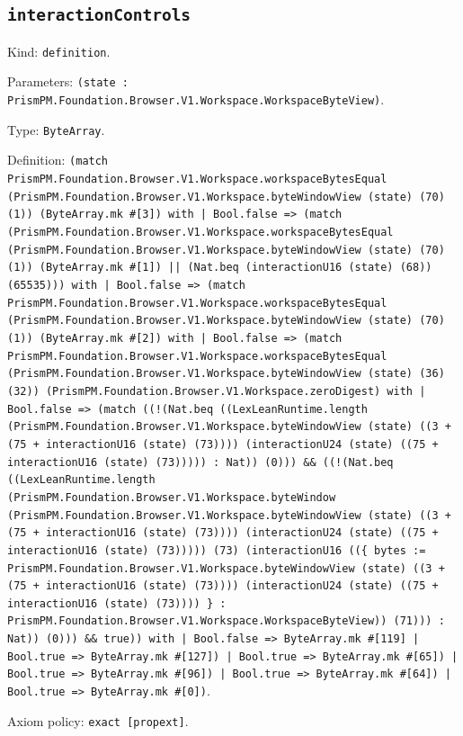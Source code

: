 \documentclass[11pt]{article}
\begin{document}
\subsection*{\texttt{interactionControls}}
\noindent Kind: \texttt{definition}.\par
\noindent Parameters: \texttt{(state : PrismPM.Foundation.Browser.V1.Workspace.WorkspaceByteView)}.\par
\noindent Type: \texttt{ByteArray}.\par
\noindent Definition: \texttt{(match PrismPM.Foundation.Browser.V1.Workspace.workspaceBytesEqual (PrismPM.Foundation.Browser.V1.Workspace.byteWindowView (state) (70) (1)) (ByteArray.mk \#[3]) with | Bool.false => (match (PrismPM.Foundation.Browser.V1.Workspace.workspaceBytesEqual (PrismPM.Foundation.Browser.V1.Workspace.byteWindowView (state) (70) (1)) (ByteArray.mk \#[1]) || (Nat.beq (interactionU16 (state) (68)) (65535))) with | Bool.false => (match PrismPM.Foundation.Browser.V1.Workspace.workspaceBytesEqual (PrismPM.Foundation.Browser.V1.Workspace.byteWindowView (state) (70) (1)) (ByteArray.mk \#[2]) with | Bool.false => (match PrismPM.Foundation.Browser.V1.Workspace.workspaceBytesEqual (PrismPM.Foundation.Browser.V1.Workspace.byteWindowView (state) (36) (32)) (PrismPM.Foundation.Browser.V1.Workspace.zeroDigest) with | Bool.false => (match ((!(Nat.beq ((LexLeanRuntime.length (PrismPM.Foundation.Browser.V1.Workspace.byteWindowView (state) ((3 + (75 + interactionU16 (state) (73)))) (interactionU24 (state) ((75 + interactionU16 (state) (73))))) : Nat)) (0))) \&\& ((!(Nat.beq ((LexLeanRuntime.length (PrismPM.Foundation.Browser.V1.Workspace.byteWindow (PrismPM.Foundation.Browser.V1.Workspace.byteWindowView (state) ((3 + (75 + interactionU16 (state) (73)))) (interactionU24 (state) ((75 + interactionU16 (state) (73))))) (73) (interactionU16 ((\{ bytes := PrismPM.Foundation.Browser.V1.Workspace.byteWindowView (state) ((3 + (75 + interactionU16 (state) (73)))) (interactionU24 (state) ((75 + interactionU16 (state) (73)))) \} : PrismPM.Foundation.Browser.V1.Workspace.WorkspaceByteView)) (71))) : Nat)) (0))) \&\& true)) with | Bool.false => ByteArray.mk \#[119] | Bool.true => ByteArray.mk \#[127]) | Bool.true => ByteArray.mk \#[65]) | Bool.true => ByteArray.mk \#[96]) | Bool.true => ByteArray.mk \#[64]) | Bool.true => ByteArray.mk \#[0])}.\par
\noindent Axiom policy: \texttt{exact [propext]}.\par
\end{document}
